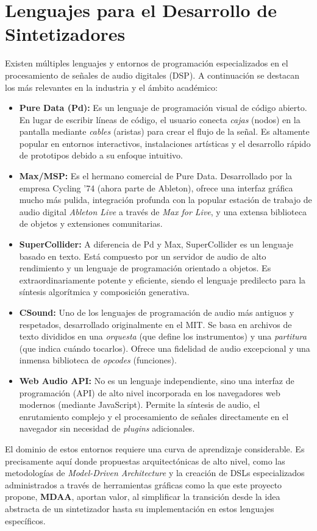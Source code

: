 \section{Lenguajes para el Desarrollo de Sintetizadores}

Existen múltiples lenguajes y entornos de programación especializados en el procesamiento de señales de audio digitales (DSP). A continuación se destacan los más relevantes en la industria y el ámbito académico:

\begin{itemize}
    \item \textbf{Pure Data (Pd):} Es un lenguaje de programación visual de código abierto. En lugar de escribir líneas de código, el usuario conecta \textit{cajas} (nodos) en la pantalla mediante \textit{cables} (aristas) para crear el flujo de la señal. Es altamente popular en entornos interactivos, instalaciones artísticas y el desarrollo rápido de prototipos debido a su enfoque intuitivo.
    \item \textbf{Max/MSP:} Es el hermano comercial de Pure Data. Desarrollado por la empresa Cycling '74 (ahora parte de Ableton), ofrece una interfaz gráfica mucho más pulida, integración profunda con la popular estación de trabajo de audio digital \textit{Ableton Live} a través de \textit{Max for Live}, y una extensa biblioteca de objetos y extensiones comunitarias.
    \item \textbf{SuperCollider:} A diferencia de Pd y Max, SuperCollider es un lenguaje basado en texto. Está compuesto por un servidor de audio de alto rendimiento y un lenguaje de programación orientado a objetos. Es extraordinariamente potente y eficiente, siendo el lenguaje predilecto para la síntesis algorítmica y composición generativa.
    \item \textbf{CSound:} Uno de los lenguajes de programación de audio más antiguos y respetados, desarrollado originalmente en el MIT. Se basa en archivos de texto divididos en una \textit{orquesta} (que define los instrumentos) y una \textit{partitura} (que indica cuándo tocarlos). Ofrece una fidelidad de audio excepcional y una inmensa biblioteca de \textit{opcodes} (funciones).
    \item \textbf{Web Audio API:} No es un lenguaje independiente, sino una interfaz de programación (API) de alto nivel incorporada en los navegadores web modernos (mediante JavaScript). Permite la síntesis de audio, el enrutamiento complejo y el procesamiento de señales directamente en el navegador sin necesidad de \textit{plugins} adicionales.
\end{itemize}

El dominio de estos entornos requiere una curva de aprendizaje considerable. Es precisamente aquí donde propuestas arquitectónicas de alto nivel, como las metodologías de \textit{Model-Driven Architecture} y la creación de DSLs especializados administrados a través de herramientas gráficas como la que este proyecto propone, \textbf{MDAA}, aportan valor, al simplificar la transición desde la idea abstracta de un sintetizador hasta su implementación en estos lenguajes específicos.
